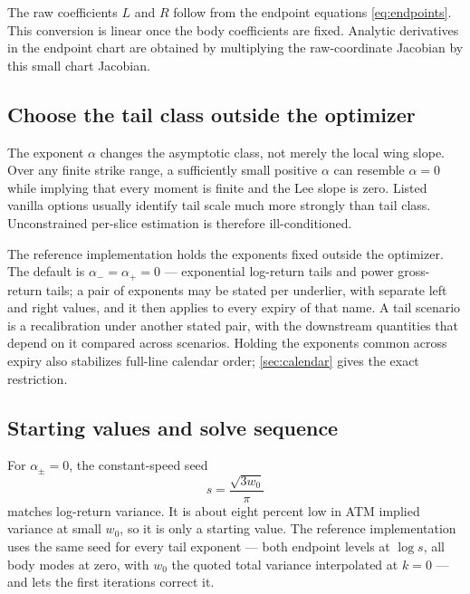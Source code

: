 The raw coefficients $L$ and $R$ follow from the endpoint equations
\eqref{eq:endpoints}.  This conversion is linear once the body coefficients
are fixed.  Analytic derivatives in the endpoint chart are obtained by
multiplying the raw-coordinate Jacobian by this small chart Jacobian.

\subsection{Choose the tail class outside the optimizer}
\label{sec:alphapolicy}

The exponent $\alpha$ changes the asymptotic class, not merely the local wing
slope.  Over any finite strike range, a sufficiently small positive $\alpha$
can resemble $\alpha=0$ while implying that every moment is finite and the
Lee slope is zero.  Listed vanilla options usually identify tail scale much
more strongly than tail class.  Unconstrained per-slice estimation is
therefore ill-conditioned.

The reference implementation holds the exponents fixed outside the
optimizer.  The default is $\alpha_-=\alpha_+=0$ --- exponential
log-return tails and power gross-return tails; a pair of exponents may
be stated per underlier, with separate left and right values, and it
then applies to every expiry of that name.  A tail scenario is a
recalibration under another stated pair, with the downstream
quantities that depend on it compared across scenarios.  Holding the
exponents common across expiry also stabilizes full-line calendar
order; \cref{sec:calendar} gives the exact restriction.

\subsection{Starting values and solve sequence}

For $\alpha_\pm=0$, the constant-speed seed
\begin{equation}
s=\frac{\sqrt{3w_0}}{\pi}
\label{eq:coldstart}
\end{equation}
matches log-return variance.  It is about eight percent low in ATM implied
variance at small $w_0$, so it is only a starting value.  The reference
implementation uses the same seed for every tail exponent --- both
endpoint levels at $\log s$, all body modes at zero, with $w_0$ the
quoted total variance interpolated at $k=0$ --- and lets the first
iterations correct it.

